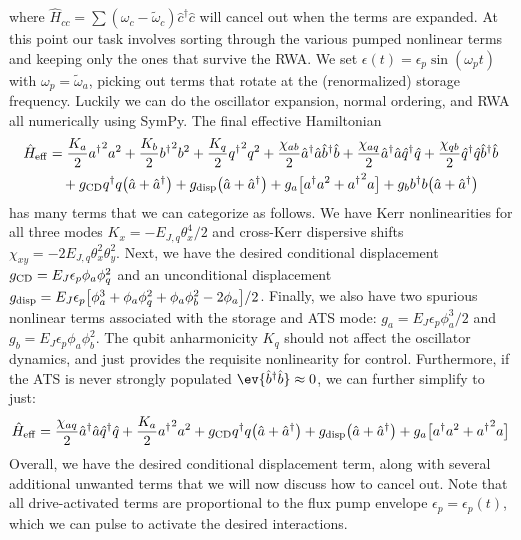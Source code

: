 where $\hat{H}_{cc} = \sum (\omega_c - \tilde{\omega}_c)\hat{c}^\dagger\hat{c}$ will cancel out when the terms are expanded. At this point our task involves sorting through the various pumped nonlinear terms and keeping only the ones that survive the RWA. We set $\epsilon(t) = \epsilon_p \sin(\omega_p t)$ with $\omega_p = \tilde{\omega}_a$, picking out terms that rotate at the (renormalized) storage frequency. Luckily we can do the oscillator expansion, normal ordering, and RWA all numerically using SymPy. The final effective Hamiltonian
\begin{align}
\begin{split}
\hat{H}_{\rm eff} &= \frac{K_a}{2}{{a}^\dagger}^{2} {a}^{2} + \frac{K_b}{2}{{b}^\dagger}^{2} {b}^{2} + \frac{K_q}{2}{{q}^\dagger}^{2} {q}^{2} + \frac{\chi_{ab}}{2}\hat{a}^\dagger\hat{a}\hat{b}^\dagger\hat{b} + \frac{\chi_{aq}}{2} \hat{a}^\dagger\hat{a}\hat{q}^\dagger\hat{q} + \frac{\chi_{qb}}{2} \hat{q}^\dagger\hat{q}\hat{b}^\dagger\hat{b} \\
&\quad + g_{\rm CD}{{q}^\dagger} {q}\big(\hat{a} + \hat{a}^\dagger\big) + g_{\rm disp} \big(\hat{a}+\hat{a}^\dagger\big) + g_a\big[{{a}^\dagger} {a}^{2} + {{a}^\dagger}^{2} {a}\big] + g_b {{b}^\dagger} {b}\big(\hat{a} + \hat{a}^\dagger\big) 
\end{split}
\end{align}
has many terms that we can categorize as follows. We have Kerr nonlinearities for all three modes $K_x = -E_{J, q}\theta_{x}^{4} / 2$ and cross-Kerr dispersive shifts $\chi_{xy} = -2E_{J, q}\theta_{x}^{2} \theta_{y}^{2}$. Next, we have the desired conditional displacement $g_{\rm CD} = E_J\epsilon_{p} \phi_{a} \phi_{q}^{2}$ and an unconditional displacement $g_{\rm disp} = E_J\epsilon_p\big[\phi_a^3 +\phi_{a} \phi_{q}^{2} + \phi_{a} \phi_{b}^{2} - 2\phi_a\big]/2$. Finally, we also have two spurious nonlinear terms associated with the storage and ATS mode: $g_a = E_J\epsilon_{p} \phi_{a}^{3}/2$ and $g_b = E_J\epsilon_{p} \phi_{a}\phi_{b}^{2}$. The qubit anharmonicity $K_q$ should not affect the oscillator dynamics, and just provides the requisite nonlinearity for control. Furthermore, if the ATS is never strongly populated $\ev{\hat{b}^\dagger\hat{b}} \approx 0$, we can further simplify to just:
\begin{equation}
\hat{H}_{\rm eff} = \frac{\chi_{aq}}{2} \hat{a}^\dagger\hat{a}\hat{q}^\dagger\hat{q} + \frac{K_a}{2}{{a}^\dagger}^{2} {a}^{2} + g_{\rm CD}{{q}^\dagger} {q}\big(\hat{a} + \hat{a}^\dagger\big) + g_{\rm disp} \big(\hat{a}+\hat{a}^\dagger\big) + g_a\big[{{a}^\dagger} {a}^{2} + {{a}^\dagger}^{2} {a}\big]
\label{eq:5_FCD_full_hamiltonian}
\end{equation}
Overall, we have the desired conditional displacement term, along with several additional unwanted terms that we will now discuss how to cancel out. Note that all drive-activated terms are proportional to the flux pump envelope $\epsilon_p = \epsilon_p(t)$, which we can pulse to activate the desired interactions. 

